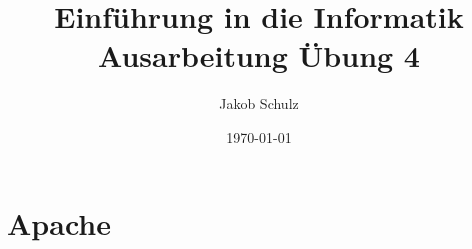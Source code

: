 \documentclass[a4paper,11pt,titlepage]{article}
\begin{document}
\title{Einf\"uhrung in die Informatik\\
Ausarbeitung \"Ubung 4}


\author{Jakob Schulz}


\date{\today}

\maketitle{\thispagestyle{plain}}

\section{Apache}
\end{document}
